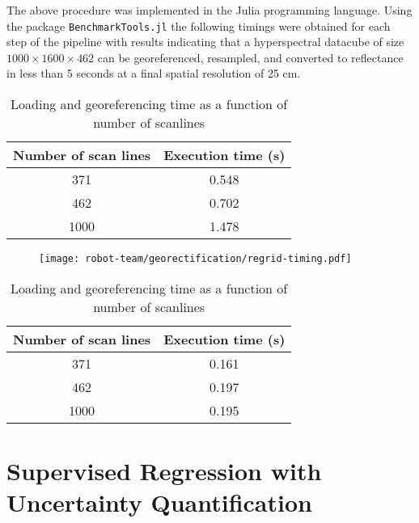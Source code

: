 The above procedure was implemented in the Julia programming language. Using the package \texttt{BenchmarkTools.jl} the following timings were obtained for each step of the pipeline with results indicating that a hyperspectral datacube of size $1000\times 1600\times 462$ can be georeferenced, resampled, and converted to reflectance in less than 5 seconds at a final spatial resolution of 25 cm.

\begin{table}[!hbt]
  \centering
  \begin{tabular}{ |c|c| }
    \hline
    \textbf{Number of scan lines}	& \textbf{Execution time (s)}\\
    \hline
    371		  &   0.548	\\
    462     &   0.702	\\
    1000    &   1.478  \\
    \hline
  \end{tabular}
  \caption{Loading and georeferencing time as a function of number of scanlines}
  \label{tab:georeference-times}
\end{table}

\begin{figure}[!hbt]
  \texttt{[image: robot-team/georectification/regrid-timing.pdf]}
  \caption{}
  \label{fig-regridding-timing}
\end{figure}

\begin{table}[h]
  \centering
  \begin{tabular}{ |c|c| }
    \hline
    \textbf{Number of scan lines}	& \textbf{Execution time (s)}\\
    \hline
    371		  &   0.161	\\
    462     &   0.197	\\
    1000    &   0.195  \\
    \hline
  \end{tabular}
  \caption{Loading and georeferencing time as a function of number of scanlines}
  \label{tab:reflectance-times}
\end{table}






\section{Supervised Regression with Uncertainty Quantification}

